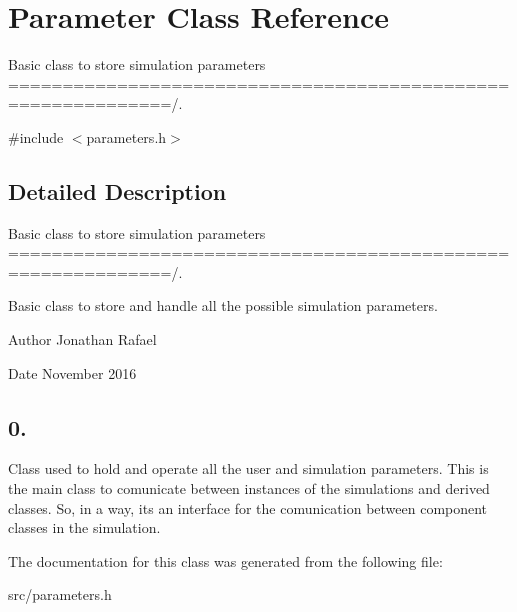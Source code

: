 \hypertarget{class_parameter}{}\section{Parameter Class Reference}
\label{class_parameter}


Basic class to store simulation parameters =============================================================/.  




{\ttfamily \#include $<$parameters.\+h$>$}



\subsection{Detailed Description}
Basic class to store simulation parameters =============================================================/. 

Basic class to store and handle all the possible simulation parameters. \begin{DoxyAuthor}{Author}
Jonathan Rafael 
\end{DoxyAuthor}
\begin{DoxyDate}{Date}
November 2016 \subsection*{0. }
\end{DoxyDate}


Class used to hold and operate all the user and simulation parameters. This is the main class to comunicate between instances of the simulations and derived classes. So, in a way, it\textquotesingle{}s an interface for the comunication between component classes in the simulation. 

The documentation for this class was generated from the following file\+:\begin{DoxyCompactItemize}
\item 
src/parameters.\+h\end{DoxyCompactItemize}
